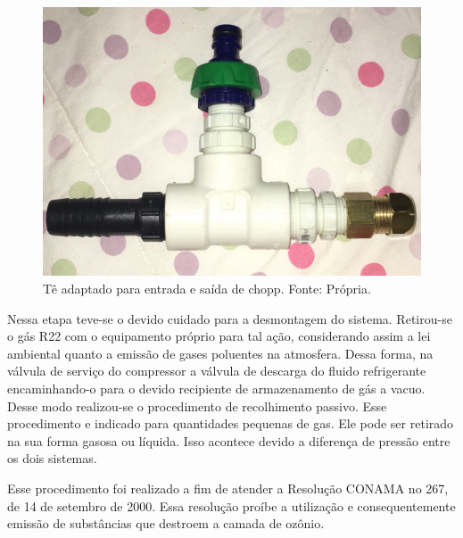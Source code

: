                         \begin{figure}[!htb]
                            \centering
                            \includegraphics[scale= 0.3]{figuras/entrada-saida-chopp.png}
                            \caption{Tê adaptado para entrada e saída de chopp. Fonte: Própria.}
                            \label{entrada-saida-chopp}
                        \end{figure}

                        Nessa etapa teve-se o devido cuidado para a desmontagem do sistema. Retirou-se o gás
                        R22 com o equipamento próprio para tal ação, considerando assim a lei ambiental
                        quanto a emissão de gases poluentes na atmosfera. Dessa forma, na válvula
                        de serviço do compressor a válvula de descarga do fluido refrigerante
                        encaminhando-o para o devido recipiente de armazenamento de gás a vacuo.
                        Desse modo realizou-se o procedimento de recolhimento passivo. Esse procedimento e
                        indicado para quantidades pequenas de gas. Ele pode ser retirado na sua forma gasosa
                        ou líquida. Isso acontece devido a diferença de pressão entre os dois sistemas.

                        Esse procedimento foi realizado a fim de atender a Resolução CONAMA no 267, de 14 de
                        setembro de 2000. Essa resolução proíbe a utilização e consequentemente emissão
                        de substâncias que destroem a camada de ozônio. 

